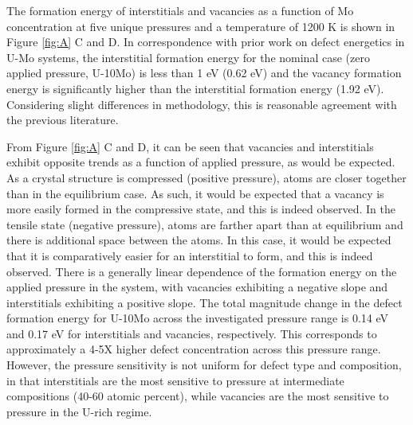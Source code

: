 \documentclass[default]{sn-jnl}%
\begin{document}
The formation energy of interstitials and vacancies as a function of Mo concentration at five unique pressures and a temperature of 1200 K is shown in Figure \ref{fig:A} C and D. In correspondence with prior work \cite{park2021} on defect energetics in U-Mo systems, the interstitial formation energy for the nominal case (zero applied pressure, U-10Mo) is less than 1 eV (0.62 eV) and the vacancy formation energy is significantly higher than the interstitial formation energy (1.92 eV). Considering slight differences in methodology, this is reasonable agreement with the previous literature. 

From Figure \ref{fig:A} C and D, it can be seen that vacancies and interstitials exhibit opposite trends as a function of applied pressure, as would be expected. As a crystal structure is compressed (positive pressure), atoms are closer together than in the equilibrium case. As such, it would be expected that a vacancy is more easily formed in the compressive state, and this is indeed observed. In the tensile state (negative pressure), atoms are farther apart than at equilibrium and there is additional space between the atoms. In this case, it would be expected that it is comparatively easier for an interstitial to form, and this is indeed observed. There is a generally linear dependence of the formation energy on the applied pressure in the system, with vacancies exhibiting a negative slope and interstitials exhibiting a positive slope. The total magnitude change in the defect formation energy for U-10Mo across the investigated pressure range is 0.14 eV and 0.17 eV for interstitials and vacancies, respectively. This corresponds to approximately a 4-5X higher defect concentration across this pressure range. However, the pressure sensitivity is not uniform for defect type and composition, in that interstitials are the most sensitive to pressure at intermediate compositions (40-60 atomic percent), while vacancies are the most sensitive to pressure in the U-rich regime. 
\end{document}
